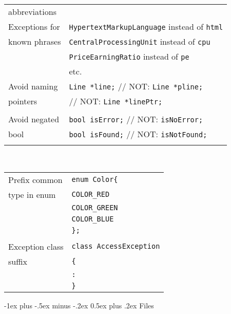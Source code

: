 \documentclass[10pt,landscape]{article}
\makeatletter
\renewcommand{\section}{\@startsection{section}{1}{0mm}%
                                {-1ex plus -.5ex minus -.2ex}%
                                {0.5ex plus .2ex}%
                                {\normalfont\large\bfseries}}
\makeatother
\begin{document}
\begin{multicols}{3}
\begin{tabular}{@{}ll@{}}
	abbreviations   & \\ 
	Exceptions for  & \verb!HypertextMarkupLanguage! instead of \verb!html! \\
	known phrases   & \verb!CentralProcessingUnit! instead of \verb!cpu! \\
	                & \verb!PriceEarningRatio! instead of \verb!pe! \\
	                & etc. \\
	Avoid naming    & \verb!Line *line;! // NOT: \verb!Line *pline;! \\
	pointers        &                    // NOT: \verb!Line *linePtr;! \\
	                & \\
	Avoid negated   & \verb!bool isError;! // NOT: \verb!isNoError;! \\
	bool            & \verb!bool isFound;! // NOT: \verb!isNotFound;! \\
	                & \\
\end{tabular} \\

\begin{tabular}{@{}ll@{}}
	Prefix common   & \verb!enum Color{! \\
	type in enum    & \hspace{0.2cm} \verb!COLOR_RED! \\
	                & \hspace{0.2cm} \verb!COLOR_GREEN! \\
	                & \hspace{0.2cm} \verb!COLOR_BLUE! \\
	                & \verb!};! \\
	                & \\
	Exception class & \verb!class AccessException! \\
	suffix          & \verb!{! \\
	                & \hspace{0.2cm} \verb!:! \\
	                & \verb!}! \\
\end{tabular}

\section{Files}

\end{multicols}
\end{document}
